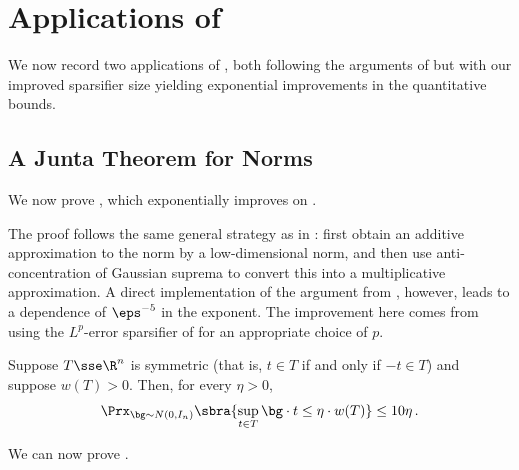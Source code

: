 \documentclass[11pt]{article}
\begin{document}
\section{Applications of }
\label{sec:apps}

We now record two applications of , both following the arguments of \cite{de2026sparsifying} but with our improved sparsifier size yielding exponential improvements in the quantitative bounds. 

\subsection{A Junta Theorem for Norms}
\label{subsec:junta}

We now prove , which exponentially improves on \cite[Theorem~2]{de2026sparsifying}. 

\normjuntathm*

The proof follows the same general strategy as in \cite{de2026sparsifying}: first obtain an additive approximation to the norm by a low-dimensional norm, and then use anti-concentration of Gaussian suprema to convert this into a multiplicative approximation.  
A direct implementation of the argument from \cite{de2026sparsifying}, however, leads to a dependence of $\eps^{-5}$ in the exponent.  
The improvement here comes from using the $L^p$-error sparsifier of  for an appropriate choice of $p$. 

\begin{lemma} 
\label{lem:DNOS-anti}
	Suppose $T \sse \R^n$ is symmetric (that is, $t \in T$ if and only if $-t \in T$) and suppose $w(T) > 0$.  
	Then, for every $\eta>0$,
	\[
		\Prx_{\bg\sim N(0,I_n)}
		\sbra{
			\sup_{t\in T}\bg\cdot t \leq \eta\cdot  w(T)
		}
		\leq
		10\eta \,.
	\]
\end{lemma}

We can now prove .
\end{document}
